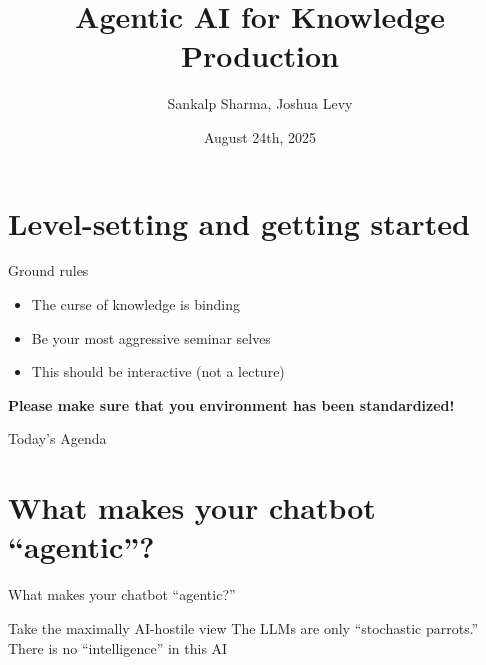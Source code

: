 \documentclass[aspectratio=1610, xcolor={dvipsnames}]{beamer}
\title{Agentic AI for Knowledge Production}
\author{Sankalp Sharma, Joshua Levy}
\institute{University of Southern California}
\date{August 24th, 2025}
\begin{document}
\begin{frame}
    \titlepage
\end{frame}
\section{Level-setting and getting started}

\begin{frame}{Ground rules}
    \begin{itemize}
        \item The curse of knowledge is binding
        \item Be your most aggressive seminar selves
        \item This should be interactive (not a lecture)
    \end{itemize}
    \vspace{3em}
    \textbf{Please make sure that you environment has been standardized!}
\end{frame}

\begin{frame}{Today's Agenda}
    \tableofcontents
\end{frame}


\section{What makes your chatbot ``agentic''?}

\begin{frame}{What makes your chatbot ``agentic?''}
    \begin{block}{Take the maximally AI-hostile view}
        \vspace{0.8em}
        The LLMs are only ``stochastic parrots.'' There is no ``intelligence'' in this AI

    \end{block}

    \vspace{2em}
\end{frame}
\end{document}
